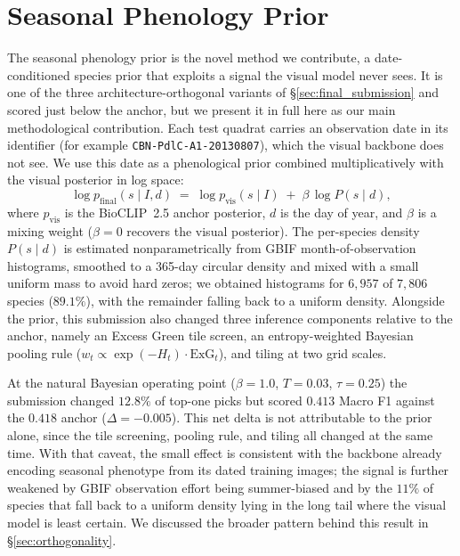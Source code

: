 \chapter{Seasonal Phenology Prior}
\label{sec:phenology}

The seasonal phenology prior is the novel method we contribute, a date-conditioned species prior that exploits a signal the visual model never sees. It is one of the three architecture-orthogonal variants of \S\ref{sec:final_submission} and scored just below the anchor, but we present it in full here as our main methodological contribution. Each test quadrat carries an observation date in its identifier (for example \texttt{CBN-PdlC-A1-20130807}), which the visual backbone does not see. We use this date as a phenological prior combined multiplicatively with the visual posterior in log space:
\begin{equation}
  \log p_{\text{final}}(s \mid I, d) \;=\; \log p_{\text{vis}}(s \mid I) \;+\; \beta \,\log P(s \mid d),
\end{equation}
where $p_{\text{vis}}$ is the BioCLIP~2.5 anchor posterior, $d$ is the day of year, and $\beta$ is a mixing weight ($\beta{=}0$ recovers the visual posterior). The per-species density $P(s\mid d)$ is estimated nonparametrically from GBIF month-of-observation histograms, smoothed to a 365-day circular density and mixed with a small uniform mass to avoid hard zeros; we obtained histograms for $6{,}957$ of $7{,}806$ species ($89.1\%$), with the remainder falling back to a uniform density. Alongside the prior, this submission also changed three inference components relative to the anchor, namely an Excess Green tile screen, an entropy-weighted Bayesian pooling rule ($w_t \propto \exp(-H_t)\cdot\mathrm{ExG}_t$), and tiling at two grid scales.

At the natural Bayesian operating point ($\beta{=}1.0$, $T{=}0.03$, $\tau{=}0.25$) the submission changed $12.8\%$ of top-one picks but scored $0.413$ Macro F1 against the $0.418$ anchor ($\Delta{=}-0.005$). This net delta is not attributable to the prior alone, since the tile screening, pooling rule, and tiling all changed at the same time. With that caveat, the small effect is consistent with the backbone already encoding seasonal phenotype from its dated training images; the signal is further weakened by GBIF observation effort being summer-biased and by the $11\%$ of species that fall back to a uniform density lying in the long tail where the visual model is least certain. We discussed the broader pattern behind this result in \S\ref{sec:orthogonality}.
